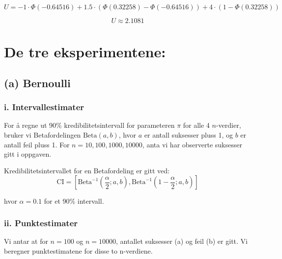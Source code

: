 \documentclass[12pt]{article}
\begin{document}
\[ U = -1 \cdot \Phi(-0.64516) + 1.5 \cdot (\Phi(0.32258) - \Phi(-0.64516)) + 4 \cdot (1 - \Phi(0.32258)) \]

\[ U \approx 2.1081 \]

  
  


\section{De tre eksperimentene:}
\subsection{(a) Bernoulli}

\subsubsection{i. Intervallestimater}
For å regne ut 90\% kredibilitetsintervall for parameteren $\pi$ for alle 4 $n$-verdier, bruker vi Betafordelingen $\text{Beta}(a,b)$, hvor $a$ er antall suksesser pluss 1, og $b$ er antall feil pluss 1. For $n = 10, 100, 1000, 10000$, anta vi har observerte suksesser gitt i oppgaven.

Kredibilitetsintervallet for en Betafordeling er gitt ved:
\[
\text{CI} = \left[\text{Beta}^{-1}\left(\frac{\alpha}{2}; a, b\right), \text{Beta}^{-1}\left(1-\frac{\alpha}{2}; a, b\right)\right]
\]

hvor $\alpha = 0.1$ for et 90\% intervall.

\subsubsection{ii. Punktestimater}
Vi antar at for $n=100$ og $n=10000$, antallet suksesser (a) og feil (b) er gitt. Vi beregner punktestimatene for disse to n-verdiene.
\end{document}

